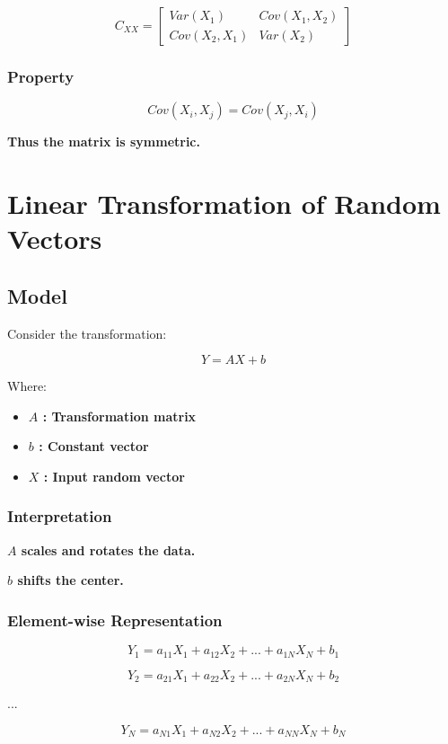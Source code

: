 \documentclass[12pt]{article}
\begin{document}
\[
C_{XX} =
\begin{bmatrix}
Var(X_1) & Cov(X_1,X_2) \\
Cov(X_2,X_1) & Var(X_2)
\end{bmatrix}
\]

\subsubsection*{\textbf{Property}}

\[
Cov(X_i,X_j) = Cov(X_j,X_i)
\]

\textbf{Thus the matrix is symmetric.}

\section{Linear Transformation of Random Vectors}

\subsection{Model}

Consider the transformation:

\[
\boxed{Y = AX + b}
\]

Where:

\begin{itemize}
\item \textbf{$A$ : Transformation matrix}
\item \textbf{$b$ : Constant vector}
\item \textbf{$X$ : Input random vector}
\end{itemize}

\subsubsection*{\textbf{Interpretation}}

\textbf{$A$ scales and rotates the data.}

\textbf{$b$ shifts the center.}

\subsubsection*{\textbf{Element-wise Representation}}

\[
Y_1 = a_{11}X_1 + a_{12}X_2 + ... + a_{1N}X_N + b_1
\]

\[
Y_2 = a_{21}X_1 + a_{22}X_2 + ... + a_{2N}X_N + b_2
\]

...

\[
Y_N = a_{N1}X_1 + a_{N2}X_2 + ... + a_{NN}X_N + b_N
\]
\end{document}
